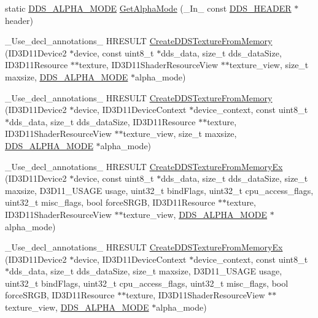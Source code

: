 \begin{DoxyCompactItemize}
\item 
static \hyperlink{namespacemage_a0c586a2bad862f4858900ca121ca80c2}{D\+D\+S\+\_\+\+A\+L\+P\+H\+A\+\_\+\+M\+O\+DE} \hyperlink{namespacemage_afcc0891e1660f8457696cb30f4ee518a}{Get\+Alpha\+Mode} (\+\_\+\+In\+\_\+ const \hyperlink{structmage_1_1_d_d_s___h_e_a_d_e_r}{D\+D\+S\+\_\+\+H\+E\+A\+D\+ER} $\ast$header)
\item 
\+\_\+\+Use\+\_\+decl\+\_\+annotations\+\_\+ H\+R\+E\+S\+U\+LT \hyperlink{namespacemage_a1570abdb85a5a68b2d78944b2446f98d}{Create\+D\+D\+S\+Texture\+From\+Memory} (I\+D3\+D11\+Device2 $\ast$device, const uint8\+\_\+t $\ast$dds\+\_\+data, size\+\_\+t dds\+\_\+data\+Size, I\+D3\+D11\+Resource $\ast$$\ast$texture, I\+D3\+D11\+Shader\+Resource\+View $\ast$$\ast$texture\+\_\+view, size\+\_\+t maxsize, \hyperlink{namespacemage_a0c586a2bad862f4858900ca121ca80c2}{D\+D\+S\+\_\+\+A\+L\+P\+H\+A\+\_\+\+M\+O\+DE} $\ast$alpha\+\_\+mode)
\item 
\+\_\+\+Use\+\_\+decl\+\_\+annotations\+\_\+ H\+R\+E\+S\+U\+LT \hyperlink{namespacemage_ad4aea1524bc1c8262da263d10cea5b5d}{Create\+D\+D\+S\+Texture\+From\+Memory} (I\+D3\+D11\+Device2 $\ast$device, I\+D3\+D11\+Device\+Context $\ast$device\+\_\+context, const uint8\+\_\+t $\ast$dds\+\_\+data, size\+\_\+t dds\+\_\+data\+Size, I\+D3\+D11\+Resource $\ast$$\ast$texture, I\+D3\+D11\+Shader\+Resource\+View $\ast$$\ast$texture\+\_\+view, size\+\_\+t maxsize, \hyperlink{namespacemage_a0c586a2bad862f4858900ca121ca80c2}{D\+D\+S\+\_\+\+A\+L\+P\+H\+A\+\_\+\+M\+O\+DE} $\ast$alpha\+\_\+mode)
\item 
\+\_\+\+Use\+\_\+decl\+\_\+annotations\+\_\+ H\+R\+E\+S\+U\+LT \hyperlink{namespacemage_ad29f0d5028acb22c5f5e1a333e6a622b}{Create\+D\+D\+S\+Texture\+From\+Memory\+Ex} (I\+D3\+D11\+Device2 $\ast$device, const uint8\+\_\+t $\ast$dds\+\_\+data, size\+\_\+t dds\+\_\+data\+Size, size\+\_\+t maxsize, D3\+D11\+\_\+\+U\+S\+A\+GE usage, uint32\+\_\+t bind\+Flags, uint32\+\_\+t cpu\+\_\+access\+\_\+flags, uint32\+\_\+t misc\+\_\+flags, bool force\+S\+R\+GB, I\+D3\+D11\+Resource $\ast$$\ast$texture, I\+D3\+D11\+Shader\+Resource\+View $\ast$$\ast$texture\+\_\+view, \hyperlink{namespacemage_a0c586a2bad862f4858900ca121ca80c2}{D\+D\+S\+\_\+\+A\+L\+P\+H\+A\+\_\+\+M\+O\+DE} $\ast$alpha\+\_\+mode)
\item 
\+\_\+\+Use\+\_\+decl\+\_\+annotations\+\_\+ H\+R\+E\+S\+U\+LT \hyperlink{namespacemage_ad5d3e9d297c74e18a84a3c1d9311e6a9}{Create\+D\+D\+S\+Texture\+From\+Memory\+Ex} (I\+D3\+D11\+Device2 $\ast$device, I\+D3\+D11\+Device\+Context $\ast$device\+\_\+context, const uint8\+\_\+t $\ast$dds\+\_\+data, size\+\_\+t dds\+\_\+data\+Size, size\+\_\+t maxsize, D3\+D11\+\_\+\+U\+S\+A\+GE usage, uint32\+\_\+t bind\+Flags, uint32\+\_\+t cpu\+\_\+access\+\_\+flags, uint32\+\_\+t misc\+\_\+flags, bool force\+S\+R\+GB, I\+D3\+D11\+Resource $\ast$$\ast$texture, I\+D3\+D11\+Shader\+Resource\+View $\ast$$\ast$texture\+\_\+view, \hyperlink{namespacemage_a0c586a2bad862f4858900ca121ca80c2}{D\+D\+S\+\_\+\+A\+L\+P\+H\+A\+\_\+\+M\+O\+DE} $\ast$alpha\+\_\+mode)

\end{DoxyCompactItemize}
